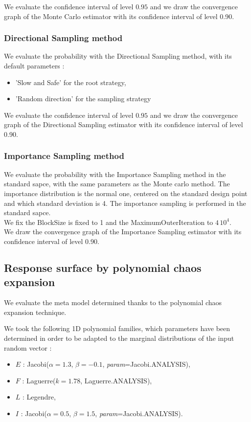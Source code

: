 \documentclass[11pt]{article}
\begin{document}
We evaluate the confidence interval of level $0.95$ and we draw the convergence graph of the Monte Carlo estimator with its confidence interval of level 0.90.



\subsubsection{Directional Sampling method}

We evaluate the probability with the Directional Sampling method, with its default parameters :
\begin{itemize}
\item 'Slow and Safe' for the root strategy,
\item 'Random direction' for the sampling strategy
\end{itemize}


We evaluate the confidence interval of level $0.95$ and we draw the convergence graph of the Directional Sampling  estimator with its confidence interval of level 0.90.


\subsubsection{Importance Sampling method}


We evaluate the probability with the Importance Sampling method in the standard sapce, with the same parameters as the Monte carlo method. The importance distribution is the normal one, centered on the standard design point and which standard deviation is 4. The importance sampling is performed in the standard sapce.\\

We fix the BlockSize is fixed to 1 and the MaximumOuterIteration to $4\, 10^4$.\\

We draw the convergence graph of the Importance Sampling  estimator with its confidence interval of level 0.90.




\subsection{Response surface by polynomial chaos expansion}


We evaluate the meta model determined thanks to the polynomial chaos expansion technique.




We took the following 1D polynomial families, which parameters have been determined in order to be adapted to the marginal distributions of the input random vector :
\begin{itemize}
\item $E$ : Jacobi($\alpha = 1.3$, $\beta = -0.1$, \textit{param}=Jacobi.ANALYSIS),
\item $F$ : Laguerre($k = 1.78$, Laguerre.ANALYSIS),
\item $L$ : Legendre,
\item $I$ : Jacobi($\alpha = 0.5$, $\beta = 1.5$, \textit{param}=Jacobi.ANALYSIS).
\end{itemize}
\end{document}
